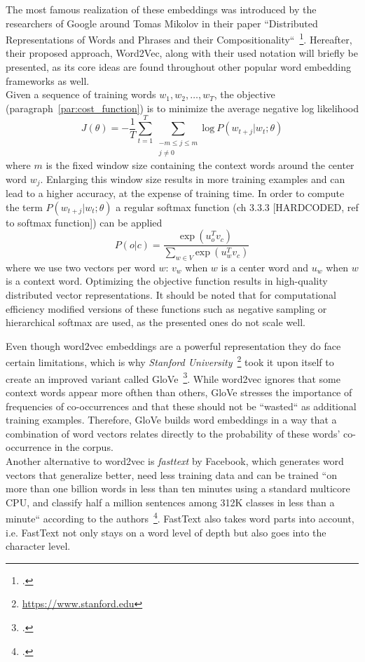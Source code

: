 The most famous realization of these embeddings was introduced by the researchers of Google around Tomas Mikolov in their paper “Distributed Representations of Words and Phrases and their Compositionality“~\footcite{DBLP:journals/corr/MikolovSCCD13}. Hereafter, their proposed approach, Word2Vec, along with their used notation will briefly be presented, as its core ideas are found throughout other popular word embedding frameworks as well. \\
Given a sequence of training words $ w_1, w_2, \dots, w_T $, the objective (paragraph~\ref{par:cost_function}) is to minimize the average negative log likelihood
\begin{equation}
	\label{eqn:skip_gram_objective_function}
	J(\theta) = - \frac{1}{T} \sum_{t=1}^{T} \sum_{\substack{-m \leq j \leq m \\ j \neq 0}} \text{log} \ P(w_{t+j} | w_t; \theta)
\end{equation}
where $ m $ is the fixed window size containing the context words around the center word $ w_j $. Enlarging this window size results in more training examples and can lead to a higher accuracy, at the expense of training time. In order to compute the term $ P(w_{t+j} | w_t; \theta) $ a regular softmax function (ch 3.3.3 [HARDCODED, ref to softmax function]) can be applied
\begin{equation}
	\label{eqn:skip_gram_conditional_probability}
	P(o | c) = \frac{\text{exp} \ (u_{o}^{T} v_{c})}{\sum_{w \in V} \text{exp} \ (u_{w}^{T} v_c)}
\end{equation}
where we use two vectors per word $ w $: $ v_w $ when $ w $ is a center word and $ u_w $ when $ w $ is a context word. Optimizing the objective function results in high-quality distributed vector representations. It should be noted that for computational efficiency modified versions of these functions such as negative sampling or hierarchical softmax are used, as the presented ones do not scale well.

Even though word2vec embeddings are a powerful representation they do face certain limitations, which is why \textit{Stanford University}~\footnote{\url{https://www.stanford.edu}} took it upon itself to create an improved variant called GloVe~\footcite{pennington-etal-2014-glove}. While word2vec ignores that some context words appear more ofthen than others, GloVe stresses the importance of frequencies of co-occurrences and that these should not be “wasted“ as additional training examples. Therefore, GloVe builds word embeddings in a way that a combination of word vectors relates directly to the probability of these words' co-occurrence in the corpus. \\
Another alternative to word2vec is \textit{fasttext} by Facebook, which generates word vectors that generalize better, need less training data and can be trained “on more than one billion words in less than ten minutes using a standard multicore CPU, and classify half a million sentences among 312K classes in less than a minute“ according to the authors~\footcite{DBLP:journals/corr/JoulinGBM16}. FastText also takes word parts into account, i.e. FastText not only stays on a word level of depth but also goes into the character level.

